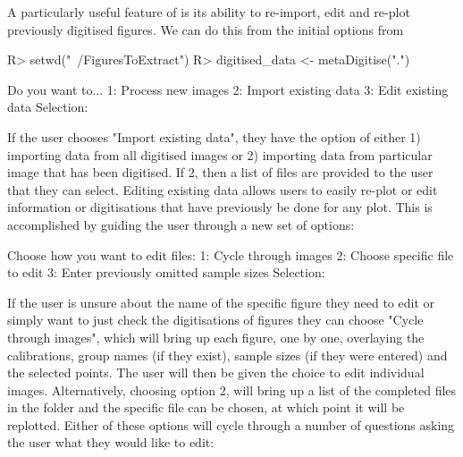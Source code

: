 \documentclass[article]{jss}
\newcommand{\fct}[1]{\code{#1()}}
\begin{document}
A particularly useful feature of  is its ability to re-import, edit and re-plot previously digitised figures. We can do this from the initial options from \fct{metaDigitise}


\begin{CodeChunk}
\begin{CodeInput}
R> setwd("~/FiguresToExtract")
R> digitised_data <- metaDigitise(".")
\end{CodeInput}
\begin{CodeOutput}
    Do you want to...
1: Process new images
2: Import existing data
3: Edit existing data
Selection: 
\end{CodeOutput}
\end{CodeChunk}

If the user chooses "Import existing data", they have the option of either 1) importing data from all digitised images or 2) importing data from particular image that has been digitised. If 2, then a list of files are provided to the user that they can select. Editing existing data allows users to easily re-plot or edit information or digitisations that have previously be done for any plot. This is accomplished by guiding the user through a new set of options:

\begin{CodeChunk}
\begin{CodeOutput}
Choose how you want to edit files:
1: Cycle through images
2: Choose specific file to edit
3: Enter previously omitted sample sizes
Selection: 
\end{CodeOutput}
\end{CodeChunk}

If the user is unsure about the name of the specific figure they need to edit or simply want to just check the digitisations of figures they can choose "Cycle through images", which will bring up each figure, one by one, overlaying the calibrations, group names (if they exist), sample sizes (if they were entered) and the selected points. The user will then be given the choice to edit individual images. Alternatively, choosing option 2, will bring up a list of the completed files in the folder and the specific file can be chosen, at which point it will be replotted. Either of these options will cycle through a number of questions asking the user what they would like to edit:
\end{document}
